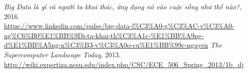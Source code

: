 \documentclass[12pt]{report}
\begin{document}
\begin{thebibliography}{30}
\textit{Big Data là gì và người ta khai thác, ứng dụng nó vào cuộc sống như thế nào?}, 2016. \\
\url{https://www.linkedin.com/pulse/big-data-l%C3%A0-g%C3%AC-v%C3%A0-ng%C6%B0%E1%BB%9Di-ta-khai-th%C3%A1c-%E1%BB%A9ng-d%E1%BB%A5ng-n%C3%B3-v%C3%A0o-cu%E1%BB%99c-nguyen}
\textit{The Supercomputer Landscape Today}, 2013. \\
\url{http://wiki.expertiza.ncsu.edu/index.php/CSC/ECE_506_Spring_2013/1b_dj}

\end{thebibliography}
\end{document}
